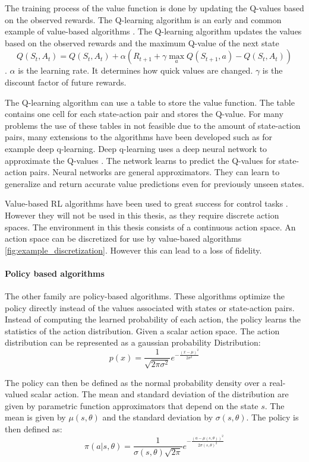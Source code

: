 The training process of the value function is done by updating the Q-values based on the observed rewards. The Q-learning algorithm is an early and common example of value-based algorithms \textcite{rlbook2020}. The Q-learning algorithm updates the values based on the observed rewards and the maximum Q-value of the next state \[Q(S_t, A_t) = Q(S_t, A_t) + \alpha (R_{t+1} + \gamma \max_a Q(S_{t+1}, a) - Q(S_t, A_t))\].
$\alpha$ is the learning rate. It determines how quick values are changed. $\gamma$ is the discount factor of future rewards.


The Q-learning algorithm can use a table to store the value function. The table contains one cell for each state-action pair and stores the Q-value. 
For many problems the use of these tables in not feasible due to the amount of state-action pairs, many extensions to the algorithms have been developed such as for example deep q-learning. Deep q-learning uses a deep neural network to approximate the Q-values \textcite{atari}. The network learns to predict the Q-values for state-action pairs. Neural networks are general approximators. They can learn to generalize and return accurate value predictions even for previously unseen states.  

Value-based \acs{RL} algorithms have been used to great success for control tasks \textcite{rlbook2020}. However they will not be used in this thesis, as they require discrete action spaces. The environment in this thesis consists of a continuous action space.
An action space can be discretized for use by value-based algorithms \ref{fig:example_discretization}. However this can lead to a loss of fidelity.


\paragraph{Policy based algorithms}
The other family are policy-based algorithms. These algorithms optimize the policy directly instead of the values associated with states or state-action pairs. Instead of computing the learned probability of each action, the policy learns the statistics of the action distribution.
Given a scalar action space. The action distribution can be represented as a gaussian probability Distribution:
\[p(x) = \frac{1}{\sqrt{2\pi\sigma^2}} e^{-\frac{(x-\mu)^2}{2\sigma^2}}\]

The policy can then be defined as the normal probability density over a real-valued scalar action. The mean and standard deviation of the distribution are given by parametric function approximators that depend on the state $s$. The mean is given by $\mu(s, \theta)$ and the standard deviation by $\sigma(s, \theta)$. The policy is then defined as:
\[\pi(a|s, \theta) = \frac{1}{\sigma(s, \theta)\sqrt{2\pi}} e^{-\frac{(a-\mu(s, \theta))^2}{2\sigma(s,\theta)^2}}\]

